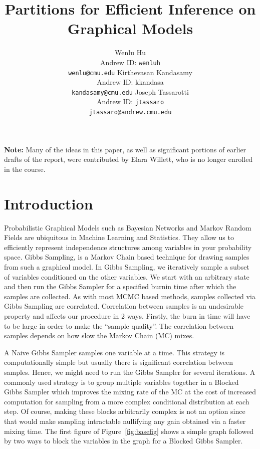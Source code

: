\documentclass{article} %
\title{Partitions for Efficient Inference on Graphical Models}
\author{
  Wenlu Hu\\
  Andrew ID: \texttt{wenluh} \\
  \texttt{wenlu@cmu.edu}
\And
  Kirthevasan Kandasamy\\
  Andrew ID: kkandasa\\
  \texttt{kandasamy@cmu.edu}
\And
  Joseph Tassarotti \\
  Andrew ID: \texttt{jtassaro} \\
  \texttt{jtassaro@andrew.cmu.edu}
}
\begin{document}
\maketitle



\textbf{Note:} Many of the ideas in this paper, as well as significant portions of earlier drafts of the report, were contributed by Elara Willett, who is no longer enrolled in the course.


\section{Introduction} 

Probabilistic Graphical Models such as Bayesian Networks and Markov Random
Fields are ubiquitous in Machine Learning and Statistics. They allow us to
efficiently represent independence structures among variables in your
probability space. Gibbs Sampling, \cite{liu01mcmcscicomp} is a Markov Chain
based technique for drawing samples from such a graphical model. 
In Gibbs Sampling, we iteratively sample a subset of variables conditioned on
the other variables. We start with an arbitrary state and then run the Gibbs
Sampler for a specified burnin time after which the samples are collected.
As with most MCMC based methods, samples collected via Gibbs Sampling 
are correlated. Correlation between samples is an undesirable property
\cite{liu01mcmcscicomp} and affects our procedure in 2 ways. Firstly, the burn
in time will have to be large in order to make the ``sample quality''.
The correlation between samples depends on how slow the Markov Chain (MC) mixes.

A Naive Gibbs Sampler samples one variable at a time. This strategy is
computationally simple but usually there is significant correlation between
samples. Hence, we might need to run the Gibbs Sampler for several iterations.
A commonly used strategy is to group multiple
variables together in a Blocked Gibbs Sampler which improves the mixing rate of
the MC at the cost of increased computation for sampling from a more complex
conditional distribution at each step. Of course, making these blocks
arbitrarily complex is not an option since that would make sampling intractable
nullifying any gain obtained via a faster mixing time. The first figure of
Figure~\ref{fig:basefig} shows a simple graph followed by two ways to block the
variables in the graph for a Blocked Gibbs Sampler.
\end{document}
